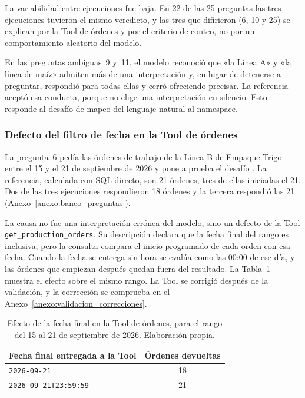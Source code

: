 La variabilidad entre ejecuciones fue baja. En 22 de las 25 preguntas las tres ejecuciones tuvieron el mismo veredicto, y las tres que difirieron (6, 10 y 25) se explican por la Tool de órdenes y por el criterio de conteo, no por un comportamiento aleatorio del modelo.

En las preguntas ambiguas~9 y~11, el modelo reconoció que «la Línea A» y «la línea de maíz» admiten más de una interpretación y, en lugar de detenerse a preguntar, respondió para todas ellas y cerró ofreciendo precisar. La referencia aceptó esa conducta, porque no elige una interpretación en silencio. Esto responde al desafío  de mapeo del lenguaje natural al namespace.

\subsubsection{Defecto del filtro de fecha en la Tool de órdenes}
\label{casop6}

La pregunta~6 pedía las órdenes de trabajo de la Línea B de Empaque Trigo entre el 15 y el 21 de septiembre de 2026 y pone a prueba el desafío . La referencia, calculada con SQL directo, son 21 órdenes, tres de ellas iniciadas el 21. Dos de las tres ejecuciones respondieron 18 órdenes y la tercera respondió las 21 (Anexo~\ref{anexo:banco_preguntas}).

La causa no fue una interpretación errónea del modelo, sino un defecto de la Tool \texttt{get\_production\_orders}. Su descripción declara que la fecha final del rango es inclusiva, pero la consulta compara el inicio programado de cada orden con esa fecha. Cuando la fecha se entrega sin hora se evalúa como las 00:00 de ese día, y las órdenes que empiezan después quedan fuera del resultado. La Tabla~\ref{tab:defecto_fecha} muestra el efecto sobre el mismo rango. La Tool se corrigió después de la validación, y la corrección se comprueba en el Anexo~\ref{anexo:validacion_correcciones}.

\begin{table}[H]
\centering
\caption{Efecto de la fecha final en la Tool de órdenes, para el rango del 15 al 21 de septiembre de 2026. Elaboración propia.}
\label{tab:defecto_fecha}
\small
\renewcommand{\arraystretch}{1.3}
\begin{tabular}{lc}
\hline
\textbf{Fecha final entregada a la Tool} & \textbf{Órdenes devueltas} \\
\hline
\texttt{2026-09-21} & 18 \\
\texttt{2026-09-21T23:59:59} & 21 \\
\hline
\end{tabular}
\end{table}

